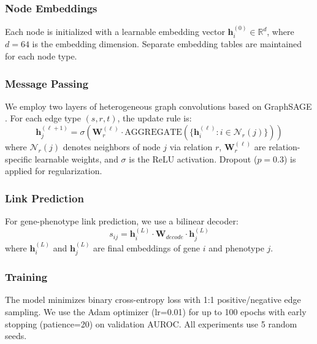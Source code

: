 \documentclass[12pt]{article}
\begin{document}
\subsubsection{Node Embeddings}

Each node is initialized with a learnable embedding vector $\mathbf{h}_i^{(0)} \in \mathbb{R}^{d}$, where $d=64$ is the embedding dimension. Separate embedding tables are maintained for each node type.

\subsubsection{Message Passing}

We employ two layers of heterogeneous graph convolutions based on GraphSAGE \citep{hamilton2017graphsage}. For each edge type $(s, r, t)$, the update rule is:
\begin{equation}
    \mathbf{h}_j^{(\ell+1)} = \sigma\left(\mathbf{W}_r^{(\ell)} \cdot \text{AGGREGATE}\left(\{\mathbf{h}_i^{(\ell)} : i \in \mathcal{N}_r(j)\}\right)\right)
\end{equation}
where $\mathcal{N}_r(j)$ denotes neighbors of node $j$ via relation $r$, $\mathbf{W}_r^{(\ell)}$ are relation-specific learnable weights, and $\sigma$ is the ReLU activation. Dropout ($p=0.3$) is applied for regularization.

\subsubsection{Link Prediction}

For gene-phenotype link prediction, we use a bilinear decoder:
\begin{equation}
    s_{ij} = \mathbf{h}_i^{(L)} \cdot \mathbf{W}_{decode} \cdot \mathbf{h}_j^{(L)}
\end{equation}
where $\mathbf{h}_i^{(L)}$ and $\mathbf{h}_j^{(L)}$ are final embeddings of gene $i$ and phenotype $j$.

\subsubsection{Training}

The model minimizes binary cross-entropy loss with 1:1 positive/negative edge sampling. We use the Adam optimizer (lr=0.01) for up to 100 epochs with early stopping (patience=20) on validation AUROC. All experiments use 5 random seeds.

\end{document}
